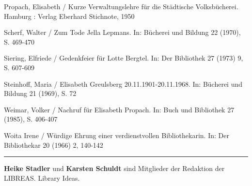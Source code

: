 \documentclass[a4paper,
fontsize=11pt,
oneside,
numbers=noperiodatend,
parskip=half-,
bibliography=totoc,
final
]{scrartcl}
\begin{document}
Propach, Elisabeth / Kurze Verwaltungslehre für die Städtische
Volksbücherei. Hamburg : Verlag Eberhard Stichnote, 1950

Scherf, Walter / Zum Tode Jella Lepmans. In: Bücherei und Bildung 22
(1970), S. 469-470

Siering, Elfriede / Gedenkfeier für Lotte Bergtel. In: Der Bibliothek 27
(1973) 9, S. 607-609

Steinhoff, Maria / Elisabeth Greulsberg 20.11.1901-20.11.1968. In:
Bücherei und Bildung 21 (1969), S. 72

Weimar, Volker / Nachruf für Elisabeth Propach. In: Buch und Bibliothek
27 (1985), S. 406-407

Woita Irene / Würdige Ehrung einer verdienstvollen Bibliothekarin. In:
Der Bibliothekar 20 (1966) 2, 140-142

\begin{center}\rule{3in}{0.4pt}\end{center}

\textbf{Heike Stadler} und \textbf{Karsten Schuldt} sind Mitglieder der
Redaktion der LIBREAS. Library Ideas.
\end{document}
